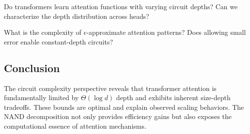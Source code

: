 \begin{problem}






Do transformers learn attention functions with varying circuit depths? Can we characterize the depth distribution across heads?






\end{problem}













\begin{problem}






What is the complexity of $\epsilon$-approximate attention patterns? Does allowing small error enable constant-depth circuits?






\end{problem}













\subsection{Conclusion}













The circuit complexity perspective reveals that transformer attention is fundamentally limited by $\Theta(\log d)$ depth and exhibits inherent size-depth tradeoffs. These bounds are optimal and explain observed scaling behaviors. The NAND decomposition not only provides efficiency gains but also exposes the computational essence of attention mechanisms.













